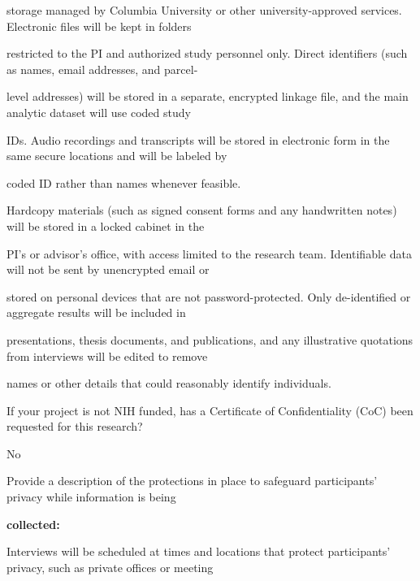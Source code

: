 \documentclass[10pt, letterpaper]{article}
\begin{document}
storage managed by Columbia University or other university-approved services. Electronic files will be kept in folders

restricted to the PI and authorized study personnel only. Direct identifiers (such as names, email addresses, and parcel-

level addresses) will be stored in a separate, encrypted linkage file, and the main analytic dataset will use coded study

IDs. Audio recordings and transcripts will be stored in electronic form in the same secure locations and will be labeled by

coded ID rather than names whenever feasible.

\vspace{0.5em}

\vspace{0.5em}

Hardcopy materials (such as signed consent forms and any handwritten notes) will be stored in a locked cabinet in the

PI’s or advisor’s office, with access limited to the research team. Identifiable data will not be sent by unencrypted email or

stored on personal devices that are not password-protected. Only de-identified or aggregate results will be included in

presentations, thesis documents, and publications, and any illustrative quotations from interviews will be edited to remove

names or other details that could reasonably identify individuals.

\vspace{0.5em}

\vspace{0.5em}

If your project is not NIH funded, has a Certificate of Confidentiality (CoC) been requested for this research?

No

\vspace{0.5em}

\vspace{0.5em}

Provide a description of the protections in place to safeguard participants' privacy while information is being

\noindent \textbf{collected:}

Interviews will be scheduled at times and locations that protect participants’ privacy, such as private offices or meeting
\end{document}
